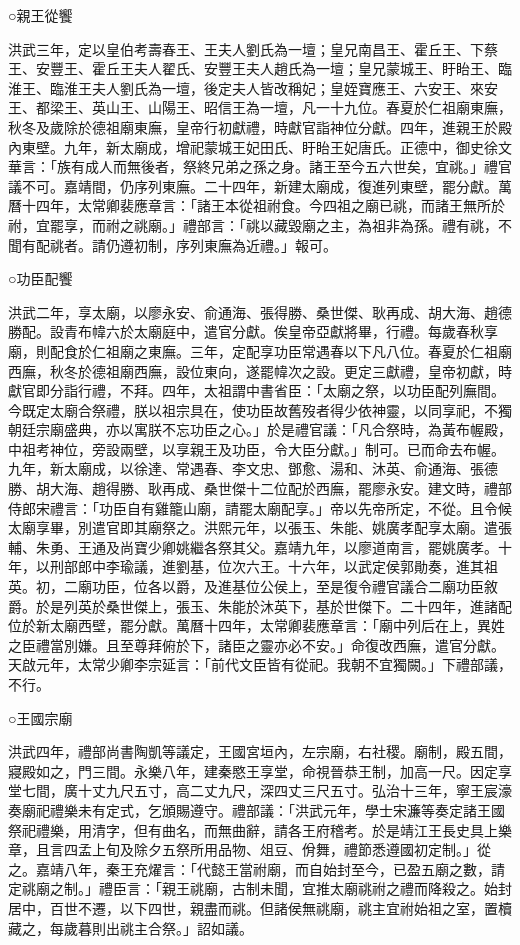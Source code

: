 ○親王從饗

洪武三年，定以皇伯考壽春王、王夫人劉氏為一壇；皇兄南昌王、霍丘王、下蔡王、安豐王、霍丘王夫人翟氏、安豐王夫人趙氏為一壇；皇兄蒙城王、盱眙王、臨淮王、臨淮王夫人劉氏為一壇，後定夫人皆改稱妃；皇姪寶應王、六安王、來安王、都梁王、英山王、山陽王、昭信王為一壇，凡一十九位。春夏於仁祖廟東廡，秋冬及歲除於德祖廟東廡，皇帝行初獻禮，時獻官詣神位分獻。四年，進親王於殿內東壁。九年，新太廟成，增祀蒙城王妃田氏、盱眙王妃唐氏。正德中，御史徐文華言：「族有成人而無後者，祭終兄弟之孫之身。諸王至今五六世矣，宜祧。」禮官議不可。嘉靖間，仍序列東廡。二十四年，新建太廟成，復進列東壁，罷分獻。萬曆十四年，太常卿裴應章言：「諸王本從祖祔食。今四祖之廟已祧，而諸王無所於祔，宜罷享，而祔之祧廟。」禮部言：「祧以藏毀廟之主，為祖非為孫。禮有祧，不聞有配祧者。請仍遵初制，序列東廡為近禮。」報可。

○功臣配饗

洪武二年，享太廟，以廖永安、俞通海、張得勝、桑世傑、耿再成、胡大海、趙德勝配。設青布幃六於太廟庭中，遣官分獻。俟皇帝亞獻將畢，行禮。每歲春秋享廟，則配食於仁祖廟之東廡。三年，定配享功臣常遇春以下凡八位。春夏於仁祖廟西廡，秋冬於德祖廟西廡，設位東向，遂罷幃次之設。更定三獻禮，皇帝初獻，時獻官即分詣行禮，不拜。四年，太祖謂中書省臣：「太廟之祭，以功臣配列廡間。今既定太廟合祭禮，朕以祖宗具在，使功臣故舊歿者得少依神靈，以同享祀，不獨朝廷宗廟盛典，亦以寓朕不忘功臣之心。」於是禮官議：「凡合祭時，為黃布幄殿，中祖考神位，旁設兩壁，以享親王及功臣，令大臣分獻。」制可。已而命去布幄。九年，新太廟成，以徐達、常遇春、李文忠、鄧愈、湯和、沐英、俞通海、張德勝、胡大海、趙得勝、耿再成、桑世傑十二位配於西廡，罷廖永安。建文時，禮部侍郎宋禮言：「功臣自有雞籠山廟，請罷太廟配享。」帝以先帝所定，不從。且令候太廟享畢，別遣官即其廟祭之。洪熙元年，以張玉、朱能、姚廣孝配享太廟。遣張輔、朱勇、王通及尚寶少卿姚繼各祭其父。嘉靖九年，以廖道南言，罷姚廣孝。十年，以刑部郎中李瑜議，進劉基，位次六王。十六年，以武定侯郭勛奏，進其祖英。初，二廟功臣，位各以爵，及進基位公侯上，至是復令禮官議合二廟功臣敘爵。於是列英於桑世傑上，張玉、朱能於沐英下，基於世傑下。二十四年，進諸配位於新太廟西壁，罷分獻。萬曆十四年，太常卿裴應章言：「廟中列后在上，異姓之臣禮當別嫌。且至尊拜俯於下，諸臣之靈亦必不安。」命復改西廡，遣官分獻。天啟元年，太常少卿李宗延言：「前代文臣皆有從祀。我朝不宜獨闕。」下禮部議，不行。

○王國宗廟

洪武四年，禮部尚書陶凱等議定，王國宮垣內，左宗廟，右社稷。廟制，殿五間，寢殿如之，門三間。永樂八年，建秦愍王享堂，命視晉恭王制，加高一尺。因定享堂七間，廣十丈九尺五寸，高二丈九尺，深四丈三尺五寸。弘治十三年，寧王宸濠奏廟祀禮樂未有定式，乞頒賜遵守。禮部議：「洪武元年，學士宋濂等奏定諸王國祭祀禮樂，用清字，但有曲名，而無曲辭，請各王府稽考。於是靖江王長史具上樂章，且言四孟上旬及除夕五祭所用品物、俎豆、佾舞，禮節悉遵國初定制。」從之。嘉靖八年，秦王充燿言：「代懿王當祔廟，而自始封至今，已盈五廟之數，請定祧廟之制。」禮臣言：「親王祧廟，古制未聞，宜推太廟祧祔之禮而降殺之。始封居中，百世不遷，以下四世，親盡而祧。但諸侯無祧廟，祧主宜祔始祖之室，置櫝藏之，每歲暮則出祧主合祭。」詔如議。

